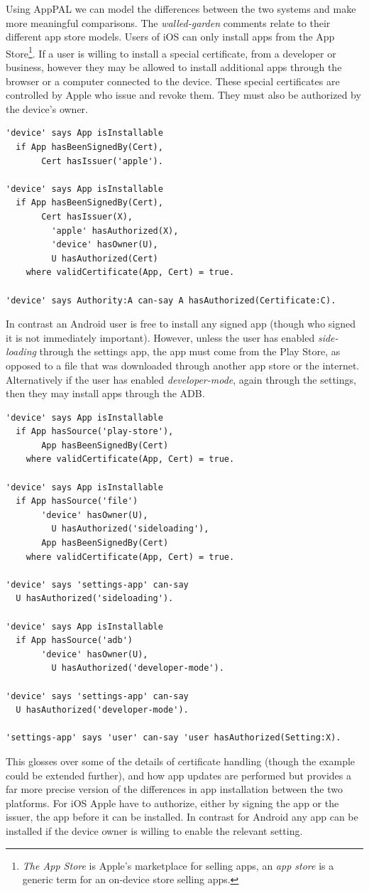 \documentclass[thesis.tex]{subfiles}
\begin{document}
Using AppPAL we can model the differences between the two systems and make more meaningful comparisons.
The \emph{walled-garden} comments relate to their different app store models.
Users of iOS can only install apps from the App Store\footnote{\emph{The App Store} is Apple's marketplace for selling apps, an \emph{app store} is a generic term for an on-device store selling apps.}.
If a user is willing to install a special certificate, from a developer or business, however they may be allowed to install additional apps through the browser or a computer connected to the device.
These special certificates are controlled by Apple who issue and revoke them.
They must also be authorized by the device's owner.
\begin{lstlisting}
'device' says App isInstallable
  if App hasBeenSignedBy(Cert),
	   Cert hasIssuer('apple').

'device' says App isInstallable
  if App hasBeenSignedBy(Cert),
	   Cert hasIssuer(X),
		 'apple' hasAuthorized(X),
		 'device' hasOwner(U),
		 U hasAuthorized(Cert)
	where validCertificate(App, Cert) = true.

'device' says Authority:A can-say A hasAuthorized(Certificate:C).
\end{lstlisting}
In contrast an Android user is free to install any signed app (though who signed it is not immediately important). 
However, unless the user has enabled \emph{side-loading} through the settings app, the app must come from the Play Store, as opposed to a file that was downloaded through another app store or the internet.
Alternatively if the user has enabled \emph{developer-mode}, again through the settings, then they may install apps through the \ac{ADB}.
\begin{lstlisting}
'device' says App isInstallable
  if App hasSource('play-store'),
	   App hasBeenSignedBy(Cert)
	where validCertificate(App, Cert) = true.

'device' says App isInstallable
  if App hasSource('file')
	   'device' hasOwner(U),
		 U hasAuthorized('sideloading'),
	   App hasBeenSignedBy(Cert)
	where validCertificate(App, Cert) = true.

'device' says 'settings-app' can-say
  U hasAuthorized('sideloading').

'device' says App isInstallable
  if App hasSource('adb')
	   'device' hasOwner(U),
		 U hasAuthorized('developer-mode').

'device' says 'settings-app' can-say
  U hasAuthorized('developer-mode').

'settings-app' says 'user' can-say 'user hasAuthorized(Setting:X).
\end{lstlisting}
This glosses over some of the details of certificate handling (though the example could be extended further), and how app updates are performed but provides a far more precise version of the differences in app installation between the two platforms.
For iOS Apple have to authorize, either by signing the app or the issuer, the app before it can be installed.
In contrast for Android any app can be installed if the device owner is willing to enable the relevant setting.
\end{document}
